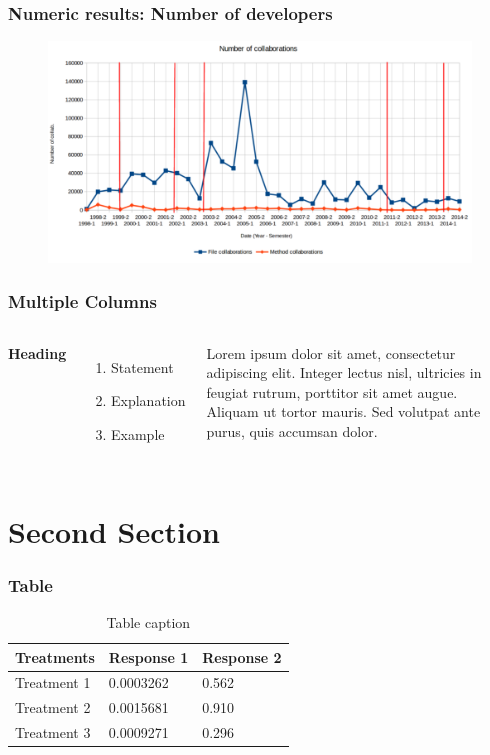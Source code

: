 \documentclass{beamer}
\begin{document}
\begin{frame}
\frametitle{Numeric results: Number of developers}
\begin{figure}
\includegraphics[scale=0.32]{chart2.png}
\label{fig:chartdev2}
\end{figure}
\end{frame}

\begin{frame}
\frametitle{Multiple Columns}
\begin{columns}[c] %

\textbf{Heading}
\begin{enumerate}
\item Statement
\item Explanation
\item Example
\end{enumerate}

Lorem ipsum dolor sit amet, consectetur adipiscing elit. Integer lectus nisl, ultricies in feugiat rutrum, porttitor sit amet augue. Aliquam ut tortor mauris. Sed volutpat ante purus, quis accumsan dolor.

\end{columns}
\end{frame}

\section{Second Section}

\begin{frame}
\frametitle{Table}
\begin{table}
\begin{tabular}{l l l}
\toprule
\textbf{Treatments} & \textbf{Response 1} & \textbf{Response 2}\\
\midrule
Treatment 1 & 0.0003262 & 0.562 \\
Treatment 2 & 0.0015681 & 0.910 \\
Treatment 3 & 0.0009271 & 0.296 \\
\bottomrule
\end{tabular}
\caption{Table caption}
\end{table}
\end{frame}
\end{document}
